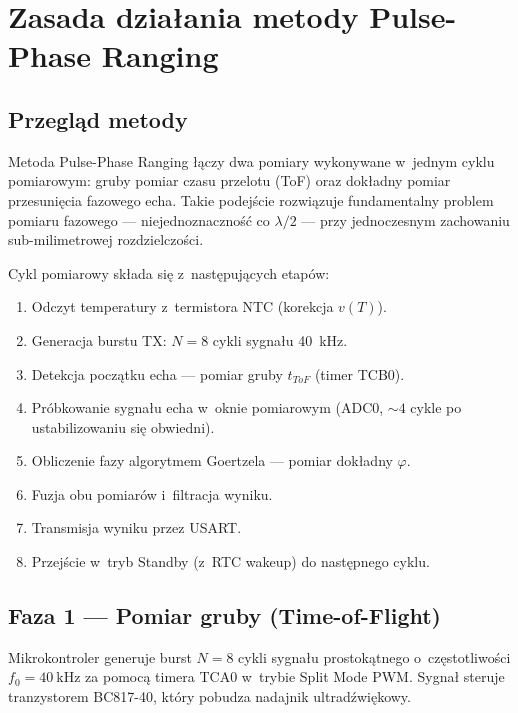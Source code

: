 \documentclass[a4paper,11pt]{article}
\begin{document}
\section{Zasada działania metody Pulse-Phase Ranging}
\label{sec:zasada}

\subsection{Przegląd metody}

Metoda Pulse-Phase Ranging łączy dwa pomiary wykonywane w~jednym cyklu
pomiarowym: gruby pomiar czasu przelotu (ToF) oraz dokładny pomiar przesunięcia
fazowego echa. Takie podejście rozwiązuje fundamentalny problem pomiaru fazowego
--- niejednoznaczność co $\lambda/2$ --- przy jednoczesnym zachowaniu sub-milimetrowej
rozdzielczości.

Cykl pomiarowy składa się z~następujących etapów:
\begin{enumerate}[nosep]
    \item Odczyt temperatury z~termistora NTC (korekcja $v(T)$).
    \item Generacja burstu TX: $N = 8$ cykli sygnału \SI{40}{\kilo\hertz}.
    \item Detekcja początku echa --- pomiar gruby $t_{ToF}$ (timer TCB0).
    \item Próbkowanie sygnału echa w~oknie pomiarowym (ADC0, ${\sim}4$ cykle po ustabilizowaniu się obwiedni).
    \item Obliczenie fazy algorytmem Goertzela --- pomiar dokładny $\varphi$.
    \item Fuzja obu pomiarów i~filtracja wyniku.
    \item Transmisja wyniku przez USART.
    \item Przejście w~tryb Standby (z~RTC wakeup) do następnego cyklu.
\end{enumerate}

\subsection{Faza 1 --- Pomiar gruby (Time-of-Flight)}
\label{sec:tof}

Mikrokontroler generuje burst $N = 8$ cykli sygnału prostokątnego o~częstotliwości
$f_0 = \SI{40}{\kilo\hertz}$ za pomocą timera TCA0 w~trybie Split Mode PWM. Sygnał
steruje tranzystorem BC817-40, który pobudza nadajnik ultradźwiękowy.
\end{document}

